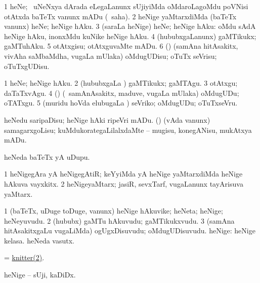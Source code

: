 \bentry
{}
\gl{\kirx}
\bmng
\emng

\noindent
\gl{\sakirx}
\bmng
\bnum
\num{1} heNe; \kanmu\ uNeNxya dArada eLegaLanunx sUjiyiMda oMdaroLagoMdu poVNisi otAtxda baTeTx \mo vanunx mADu (\akirx\ saha). 
\num{2} heNige yaMtarxdiMda (baTeTx \mo vanunx) heNe; heNige hAku. 
\num{3} (saraLa heNige) heNe; heNige hAku:  oMdu sAdA heNige hAku, inonxMdu kuNike heNige hAku. 
\num{4} (hububxgaLanunx) gaMTikukx; gaMTuhAku. 
\num{5} otAtxgisu; otAtxguvaMte mADu. 
\num{6} (\rUpa) (samAna hitAsakitx, vivAha saMbaMdha, \mo vugaLa mUlaka) oMdugUDisu; oTuTx seVrisu; oTuTxgUDisu. 
\enum
\emng

\noindent
\gl{\akirx}
\bmng
\bnum
\num{1} heNe; heNige hAku. 
\num{2} (hububxgaLa \vi) gaMTikukx; gaMTAgu. 
\num{3} otAtxgu; daTaTxvAgu. 
\num{4} (\rUpa) (\kanmu\ samAnAsakitx, maduve, \mo vugaLa mUlaka) oMdugUDu; oTATxgu. 
\num{5} (muridu hoVda elubugaLa \vi) seVriko; oMdugUDu; oTuTxseVru. 
\enum
\emng

\noindent
\gl{\pagu}
\bmng
{} 
\banum
{} heNedu saripaDisu; heNige hAki ripeVri mADu. 
 (\rUpa) (vAda \mo vanunx) samagarxgoLisu; kuMdukorategaLilalxdaMte -- mugisu, konegANisu, mukAtxya mADu. 
\eanum
\emng
\eentry

\bentry
{}
\gl{\nA}
\bmng
heNeda baTeTx yA uDupu. 
\emng
\eentry

\bentry
{}
\gl{\nA}
\bmng
\bnum
\num{1} heNigegAra yA heNigegAtiR; keYyiMda yA heNige yaMtarxdiMda heNige hAkuva vayxkitx. 
\hypertarget{knitter(2)}{} 
\num{2} heNigeyaMtarx; jasiR, sevxTarf, \mo vugaLanunx tayArisuva yaMtarx. 
\enum
\emng
\eentry

\bentry
{}
\gl{\nA}
\bmng
\bnum
\num{1} (baTeTx, uDuge toDuge, \mo vanunx) heNige hAkuvike; heNeta; heNige; heNeyuvudu. 
\num{2} (hububx) gaMTu hAkuvudu; gaMTikukxvudu. 
\num{3} (samAna hitAsakitxgaLu \mo vugaLiMda) ogUgxDisuvudu; oMdugUDisuvudu. 
 heNige: 
\banum
{} heNige kelasa. 
 heNeda vasutx. 
\eanum
\numie
\enum
\emng
\eentry

\bentry
{}
\gl{\nA}
\bmng
= \hyperlink{knitter(2)}{knitter(2)}. 
\emng
\eentry

\bentry
{}
\gl{\nA}
\bmng
heNige -- sUji, kaDiDx. 
\emng
\eentry

